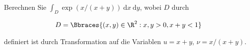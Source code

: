 
\begin{exercise}

Berechnen Sie $\int_D \exp(x / (x + y)) ~\mathrm{d} x ~\mathrm{d} y$, wobei $D$ durch

\begin{align*}
    D = \Bbraces{(x, y) \in \R^2: x, y > 0, x + y < 1}
\end{align*}

definiert ist durch Transformation auf die Variablen $u = x + y$, $\nu = x / (x + y)$.

\end{exercise}


